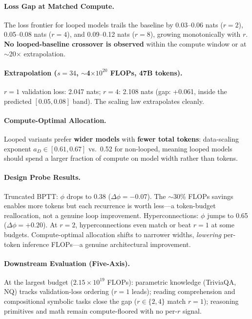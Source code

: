 \documentclass[11pt]{article}
\begin{document}
\paragraph{Loss Gap at Matched Compute.}
The loss frontier for looped models trails the baseline by 0.03--0.06 nats ($r{=}2$), 0.05--0.08 nats ($r{=}4$), and 0.09--0.12 nats ($r{=}8$), growing monotonically with $r$. \textbf{No looped-baseline crossover is observed} within the compute window or at $\sim$20$\times$ extrapolation.

\paragraph{Extrapolation ($s{=}34$, $\sim$4$\times 10^{20}$ FLOPs, 47B tokens).}
$r{=}1$ validation loss: 2.047 nats; $r{=}4$: 2.108 nats (gap: +0.061, inside the predicted $[0.05, 0.08]$ band). The scaling law extrapolates cleanly.

\paragraph{Compute-Optimal Allocation.}
Looped variants prefer \textbf{wider models} with \textbf{fewer total tokens}: data-scaling exponent $a_D \in [0.61, 0.67]$ vs.\ 0.52 for non-looped, meaning looped models should spend a larger fraction of compute on model width rather than tokens.

\paragraph{Design Probe Results.}
Truncated BPTT: $\phi$ drops to 0.38 ($\Delta\phi = -0.07$). The $\sim$30\% FLOPs savings enables more tokens but each recurrence is worth less---a token-budget reallocation, not a genuine loop improvement. Hyperconnections: $\phi$ jumps to 0.65 ($\Delta\phi = +0.20$). At $r{=}2$, hyperconnections even match or beat $r{=}1$ at some budgets. Compute-optimal allocation shifts to narrower widths, \emph{lowering} per-token inference FLOPs---a genuine architectural improvement.

\paragraph{Downstream Evaluation (Five-Axis).}
At the largest budget ($2.15 \times 10^{19}$ FLOPs): parametric knowledge (TriviaQA, NQ) tracks validation-loss ordering ($r{=}1$ leads); reading comprehension and compositional symbolic tasks close the gap ($r \in \{2, 4\}$ match $r{=}1$); reasoning primitives and math remain compute-floored with no per-$r$ signal.
\end{document}
